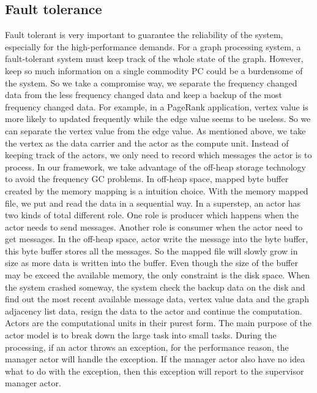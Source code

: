 \documentclass[twocolumn,a4paper,10pt]{article}
\begin{document}
\subsection{Fault tolerance}
Fault tolerant is very important to guarantee the reliability of the system, especially for the high-performance demands. For a graph processing system, a fault-tolerant system must keep track of the whole state of the graph. However, keep so much information on a single commodity PC could be a burdensome of the system. So we take a compromise way, we separate the frequency changed data from the less frequency changed data and keep a backup of the most frequency changed data. For example, in a PageRank application, vertex value is more likely to updated frequently while the edge value seems to be useless. So we can separate the vertex value from the edge value.\newline
As mentioned above, we take the vertex as the data carrier and the actor as the compute unit. Instead of keeping track of the actors, we only need to record which messages the actor is to process. In our framework, we take advantage of the off-heap storage technology to avoid the frequency GC problems. In off-heap space, mapped byte buffer created by the memory mapping is a intuition choice. With the memory mapped file, we put and read the data in a sequential way. In a superstep, an actor has two kinds of total different role. One role is producer which happens when the actor needs to send messages. Another role is consumer when the actor need to get messages. In the off-heap space, actor write the message into the byte buffer, this byte buffer stores all the messages. So the mapped file will slowly grow in size as more data is written into the buffer. Even though the size of the buffer may be exceed the available memory, the only constraint is the disk space. When the system crashed someway, the system check the backup data on the disk and find out the most recent available message data, vertex value data and the graph adjacency list data, resign the data to the actor and continue the computation.\newline
Actors are the computational units in their purest form. The main purpose of the actor model is to break down the large task into small tasks. During the processing, if an actor throws an exception, for the performance reason, the manager actor will handle the exception. If the manager actor also have no idea what to do with the exception, then this exception will report to the supervisor manager actor.
\end{document}
